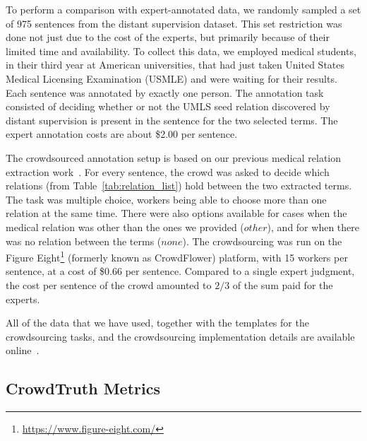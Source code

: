 To perform a comparison with expert-annotated data, we randomly sampled a set of 975 sentences from the distant supervision dataset. This set restriction was done not just due to the cost of the experts, but primarily because of their limited time and availability. To collect this data, we employed medical students, in their third year at American universities, that had just taken  United States Medical Licensing Examination (USMLE) and were waiting for their results.  Each sentence was annotated by exactly one person. The annotation task consisted of deciding whether or not the UMLS seed relation discovered by distant supervision is present in the sentence for the two selected terms. The expert annotation costs are about \$2.00 per sentence.

The crowdsourced annotation setup is based on our previous medical relation extraction work~\cite{aroyo2014threesides}. For every sentence, the crowd was asked to decide which relations (from Table~\ref{tab:relation_list}) hold between the two extracted terms. The task was multiple choice, workers being able to choose more than one relation at the same time.  There were also options available for cases when the medical relation was other than the ones we provided ($other$), and for when there was no relation between the terms ($none$). The crowdsourcing was run on the Figure Eight\footnote{\url{https://www.figure-eight.com/}} (formerly known as CrowdFlower) platform, with 15 workers per sentence, at a cost of \$0.66 per sentence. Compared to a single expert judgment, the cost per sentence of the crowd amounted to  $2/3$ of the sum paid for the experts.

All of the data that we have used, together with the templates for the crowdsourcing tasks, and the crowdsourcing implementation details are available online~\cite{anca_dumitrache_2016_50676}.


\subsection{CrowdTruth Metrics}
\label{sec:chap2_metrics}

